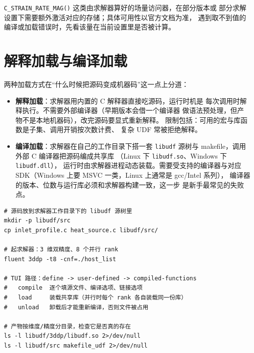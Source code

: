 \documentclass[12pt,a4paper,fontset=fandol]{ctexbook}
\newcommand{\Fn}[1]{\texttt{#1()}}
\newcommand{\Tp}[1]{\texttt{#1}}
\newcommand{\Lang}[1]{\textsf{#1}}
\newcommand{\CL}{\Lang{C}}
\begin{document}
\Fn{C\_STRAIN\_RATE\_MAG} 这类由求解器算好的场量访问器，在部分版本或
部分求解设置下需要额外激活对应的存储；具体可用性以官方文档为准，
遇到取不到值的编译或加载错误时，先看该量在当前设置里是否被计算。

\section{解释加载与编译加载}
\label{sec:ch03-load-modes}

两种加载方式在``什么时候把源码变成机器码''这一点上分道：

\begin{itemize}
  \item \textbf{解释加载}：求解器用内置的 C 解释器直接吃源码，运行时机是
        每次调用时解释执行。不需要外部编译器（早期版本会借一个编译器
        做语法预处理，但产物不是本地机器码），改完源码要显式重新解释。
        限制包括：可用的宏与库函数是子集、调用开销按次数计费、
        复杂 UDF 常被拒绝解释。
  \item \textbf{编译加载}：求解器在自己的工作目录下搭一套 \Tp{libudf}
        源树与 makefile，调用外部 \CL{} 编译器把源码编成共享库
        （Linux 下 \Tp{libudf.so}、Windows 下 \Tp{libudf.dll}），
        运行时由求解器进程动态装载。需要受支持的编译器与对应
        SDK（Windows 上要 MSVC 一类，Linux 上通常是 gcc/Intel 系列），
        编译器的版本、位数与运行库必须和求解器构建一致，这一步
        是新手最常见的失败点。
\end{itemize}

\begin{lstlisting}[language=ShellLD, style=shellstyle, caption={编译加载的典型动作序列（TUI 路径与产物检查）}, label={lst:ch03-libudf}]
# 源码放到求解器工作目录下的 libudf 源树里
mkdir -p libudf/src
cp inlet_profile.c heat_source.c libudf/src/

# 起求解器：3 维双精度、8 个并行 rank
fluent 3ddp -t8 -cnf=./host_list

# TUI 路径：define -> user-defined -> compiled-functions
#   compile  逐个填源文件、编译选项、链接选项
#   load     装载共享库（并行时每个 rank 各自装载同一份库）
#   unload   卸载后才能重新编译，否则文件被占用

# 产物按维度/精度分目录，检查它是否真的存在
ls -l libudf/3ddp/libudf.so 2>/dev/null
ls -l libudf/src makefile_udf 2>/dev/null
\end{lstlisting}
\end{document}
